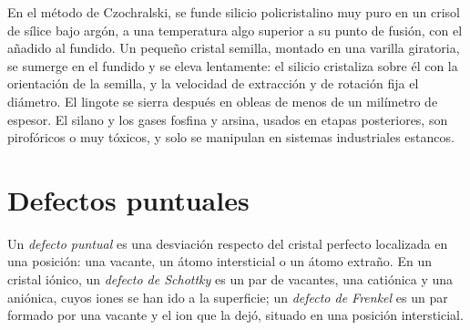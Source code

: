\begin{inthelab}
En el método de Czochralski, se funde silicio policristalino muy puro en un
crisol de sílice bajo argón, a una temperatura algo superior a su punto de fusión, con el
 añadido al fundido. Un pequeño cristal semilla, montado en una varilla giratoria, se sumerge en
el fundido y se eleva lentamente: el silicio cristaliza sobre él con la
orientación de la semilla, y la velocidad de extracción y de rotación fija el diámetro. El lingote
se sierra después en obleas de menos de un milímetro de espesor. El silano y los gases
 fosfina y arsina, usados en etapas posteriores, son pirofóricos o muy tóxicos,
y solo se manipulan en sistemas industriales estancos.
\end{inthelab}

\section{Defectos puntuales}

\begin{definition}\label{def:b3:solid-state:defects}
Un \emph{defecto puntual} es una desviación respecto del cristal
perfecto localizada en una posición: una vacante, un átomo intersticial o un átomo
extraño. En un cristal iónico, un \emph{defecto de Schottky} es un
par de vacantes, una catiónica y una aniónica, cuyos iones se han ido a la
superficie; un \emph{defecto de Frenkel} es un par formado por una
vacante y el ion que la dejó, situado en una posición intersticial.
\end{definition}

